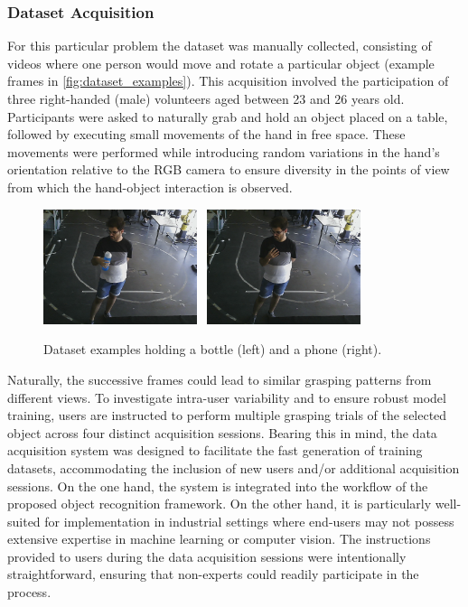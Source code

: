 \subsubsection{Dataset Acquisition}

For this particular problem the dataset was manually collected, consisting of videos where one person would move and rotate a particular object (example frames in \autoref{fig:dataset_examples}). This acquisition involved the participation of three right-handed (male) volunteers aged between 23 and 26 years old. Participants were asked to naturally grab and hold an object placed on a table, followed by executing small movements of the hand in free space. These movements were performed while introducing random variations in the hand's orientation relative to the RGB camera to ensure diversity in the points of view from which the hand-object interaction is observed.

\begin{figure}[ht]
    \centerline{\includegraphics[width=0.4\textwidth]{figs/dataset_preprocessing1_1.png} \ \includegraphics[width=0.4\textwidth]{figs/dataset_preprocessing1_2.png}}
    \caption{Dataset examples holding a bottle (left) and a phone (right).}
    \label{fig:dataset_examples}
\end{figure}

Naturally, the successive frames could lead to similar grasping patterns from different views. To investigate intra-user variability and to ensure robust model training, users are instructed to perform multiple grasping trials of the selected object across four distinct acquisition sessions. Bearing this in mind, the data acquisition system was designed to facilitate the fast generation of training datasets, accommodating the inclusion of new users and/or additional acquisition sessions. On the one hand, the system is integrated into the workflow of the proposed object recognition framework. On the other hand, it is particularly well-suited for implementation in industrial settings where end-users may not possess extensive expertise in machine learning or computer vision. The instructions provided to users during the data acquisition sessions were intentionally straightforward, ensuring that non-experts could readily participate in the process.

